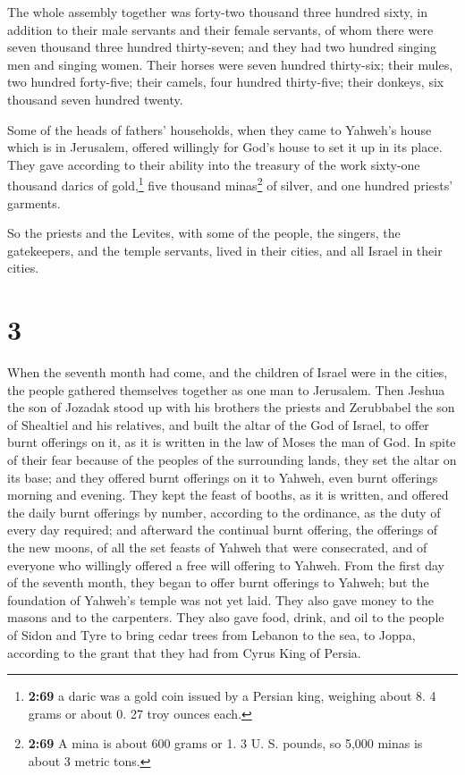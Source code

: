  The whole assembly together was forty-two thousand three
hundred sixty,  in addition to their male servants and
their female servants, of whom there were seven thousand three hundred
thirty-seven; and they had two hundred singing men and singing women.
 Their horses were seven hundred thirty-six; their mules,
two hundred forty-five;  their camels, four hundred
thirty-five; their donkeys, six thousand seven hundred twenty.

 Some of the heads of fathers' households, when they came
to Yahweh's house which is in Jerusalem, offered willingly for God's
house to set it up in its place.  They gave according to
their ability into the treasury of the work sixty-one thousand darics of
gold,\footnote{\textbf{2:69} a daric was a gold coin issued by a Persian
  king, weighing about 8. 4 grams or about 0. 27 troy ounces each.} five
thousand minas\footnote{\textbf{2:69} A mina is about 600 grams or 1. 3
  U. S. pounds, so 5,000 minas is about 3 metric tons.} of silver, and
one hundred priests' garments.

 So the priests and the Levites, with some of the people,
the singers, the gatekeepers, and the temple servants, lived in their
cities, and all Israel in their cities.

\hypertarget{section-2}{%
\section{3}\label{section-2}}

 When the seventh month had come, and the children of
Israel were in the cities, the people gathered themselves together as
one man to Jerusalem.  Then Jeshua the son of Jozadak
stood up with his brothers the priests and Zerubbabel the son of
Shealtiel and his relatives, and built the altar of the God of Israel,
to offer burnt offerings on it, as it is written in the law of Moses the
man of God.  In spite of their fear because of the peoples
of the surrounding lands, they set the altar on its base; and they
offered burnt offerings on it to Yahweh, even burnt offerings morning
and evening.  They kept the feast of booths, as it is
written, and offered the daily burnt offerings by number, according to
the ordinance, as the duty of every day required;  and
afterward the continual burnt offering, the offerings of the new moons,
of all the set feasts of Yahweh that were consecrated, and of everyone
who willingly offered a free will offering to Yahweh. 
From the first day of the seventh month, they began to offer burnt
offerings to Yahweh; but the foundation of Yahweh's temple was not yet
laid.  They also gave money to the masons and to the
carpenters. They also gave food, drink, and oil to the people of Sidon
and Tyre to bring cedar trees from Lebanon to the sea, to Joppa,
according to the grant that they had from Cyrus King of Persia.

